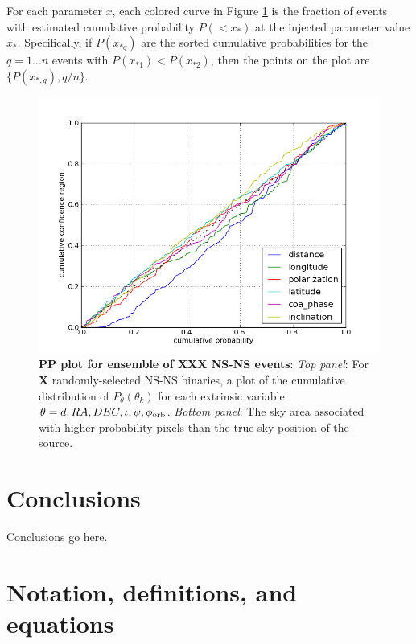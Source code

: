 \documentclass[twocolumn,prd,nofootinbib]{revtex4}
\begin{document}

For each parameter $x$, each colored curve in Figure  \ref{fig:pp:2015Ensemble} is  the fraction of events with
estimated cumulative probability $P(<x_*)$ at the injected parameter value $x_*$.  
Specifically, if $P(x_{*q})$ are the sorted cumulative probabilities for the $q=1\ldots n$ events with
$P(x_{*1})<P(x_{*2})$, then the points on the plot are $\{P(x_{*,q}),q/n\}$.  
%

\begin{figure}
\includegraphics[width=\columnwidth]{../Figures/2015_BNS_MDC_pat_and_chris_pp_plot}
\caption{\label{fig:pp:2015Ensemble}\textbf{PP plot for ensemble of XXX NS-NS events}: \emph{Top panel}: For \textbf{X} randomly-selected NS-NS binaries, a plot of
  the cumulative distribution of $P_\theta(\theta_k)$ for each extrinsic variable $\theta=d,RA,DEC,\iota,\psi,\phi_{\rm
    orb}$.
\emph{Bottom panel}: The sky area associated with higher-probability pixels than the true sky position of the source.
}
\end{figure}


\section{Conclusions}

Conclusions go here.

\appendix


\section{Notation, definitions, and equations}
\end{document}
